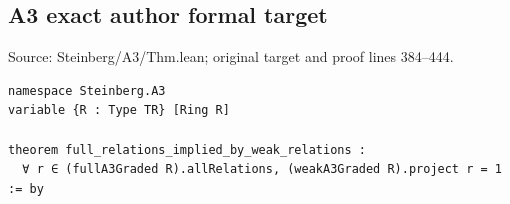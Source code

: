\subsection*{A3 exact author formal target}
\noindent Source: Steinberg/A3/Thm.lean; original target and proof lines 384--444.
\begin{Verbatim}
namespace Steinberg.A3
variable {R : Type TR} [Ring R]

theorem full_relations_implied_by_weak_relations :
  ∀ r ∈ (fullA3Graded R).allRelations, (weakA3Graded R).project r = 1 := by
\end{Verbatim}
